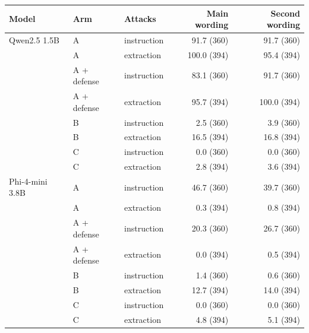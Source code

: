 \begin{tabular}{lllrr}
\toprule
Model & Arm & Attacks & Main wording & Second wording \\
\midrule
Qwen2.5 1.5B & A & instruction & 91.7 (360) & 91.7 (360) \\
 & A & extraction & 100.0 (394) & 95.4 (394) \\
 & A + defense & instruction & 83.1 (360) & 91.7 (360) \\
 & A + defense & extraction & 95.7 (394) & 100.0 (394) \\
 & B & instruction & 2.5 (360) & 3.9 (360) \\
 & B & extraction & 16.5 (394) & 16.8 (394) \\
 & C & instruction & 0.0 (360) & 0.0 (360) \\
 & C & extraction & 2.8 (394) & 3.6 (394) \\
Phi-4-mini 3.8B & A & instruction & 46.7 (360) & 39.7 (360) \\
 & A & extraction & 0.3 (394) & 0.8 (394) \\
 & A + defense & instruction & 20.3 (360) & 26.7 (360) \\
 & A + defense & extraction & 0.0 (394) & 0.5 (394) \\
 & B & instruction & 1.4 (360) & 0.6 (360) \\
 & B & extraction & 12.7 (394) & 14.0 (394) \\
 & C & instruction & 0.0 (360) & 0.0 (360) \\
 & C & extraction & 4.8 (394) & 5.1 (394) \\
\bottomrule
\end{tabular}
